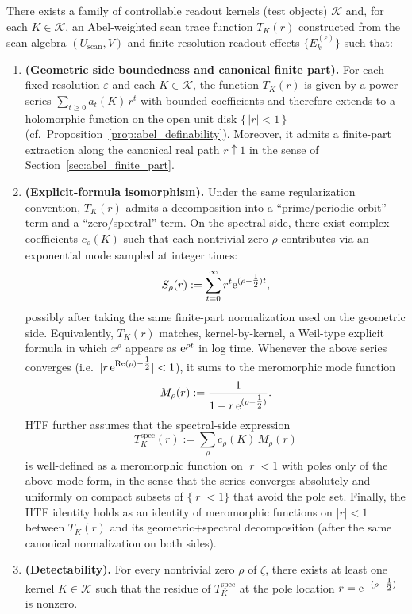 \begin{assumption}
\label{assump:HTF}
There exists a family of controllable readout kernels (test objects) $\mathcal{K}$ and, for each $K\in\mathcal{K}$, an Abel-weighted scan trace function $T_K(r)$ constructed from the scan algebra $(U_{\mathrm{scan}},V)$ and finite-resolution readout effects $\{E_k^{(\varepsilon)}\}$ such that:

\begin{enumerate}
\item \textbf{(Geometric side boundedness and canonical finite part).}
For each fixed resolution $\varepsilon$ and each $K\in\mathcal{K}$, the function $T_K(r)$ is given by a power series $\sum_{t\ge 0} a_t(K)\,r^t$ with bounded coefficients and therefore extends to a holomorphic function on the open unit disk $\{\,|r|<1\,\}$ (cf.\ Proposition~\ref{prop:abel_definability}).
Moreover, it admits a finite-part extraction along the canonical real path $r\uparrow 1$ in the sense of Section~\ref{sec:abel_finite_part}.

\item \textbf{(Explicit-formula isomorphism).}
Under the same regularization convention, $T_K(r)$ admits a decomposition into a ``prime/periodic-orbit'' term and a ``zero/spectral'' term.
On the spectral side, there exist complex coefficients $c_\rho(K)$ such that each nontrivial zero $\rho$ contributes via an exponential mode sampled at integer times:
\[
S_\rho(r):=\sum_{t=0}^{\infty} r^t \mathrm{e}^{(\rho-\tfrac{1}{2})t},
\]
possibly after taking the same finite-part normalization used on the geometric side.
Equivalently, $T_K(r)$ matches, kernel-by-kernel, a Weil-type explicit formula in which $x^\rho$ appears as $\mathrm{e}^{\rho t}$ in log time.
Whenever the above series converges (i.e.\ $|r\,\mathrm{e}^{\operatorname{Re}(\rho)-\tfrac{1}{2}}|<1$), it sums to the meromorphic mode function
\[
M_\rho(r):=\frac{1}{1-r\,\mathrm{e}^{(\rho-\tfrac{1}{2})}}.
\]
HTF further assumes that the spectral-side expression
\[
T_K^{\mathrm{spec}}(r):=\sum_{\rho} c_\rho(K)\,M_\rho(r)
\]
is well-defined as a meromorphic function on $|r|<1$ with poles only of the above mode form, in the sense that the series converges absolutely and uniformly on compact subsets of $\{|r|<1\}$ that avoid the pole set.
Finally, the HTF identity holds as an identity of meromorphic functions on $|r|<1$ between $T_K(r)$ and its geometric+spectral decomposition (after the same canonical normalization on both sides).

\item \textbf{(Detectability).}
For every nontrivial zero $\rho$ of $\zeta$, there exists at least one kernel $K\in\mathcal{K}$ such that the residue of $T_K^{\mathrm{spec}}$ at the pole location $r=\mathrm{e}^{-(\rho-\tfrac{1}{2})}$ is nonzero.
\end{enumerate}
\end{assumption}

